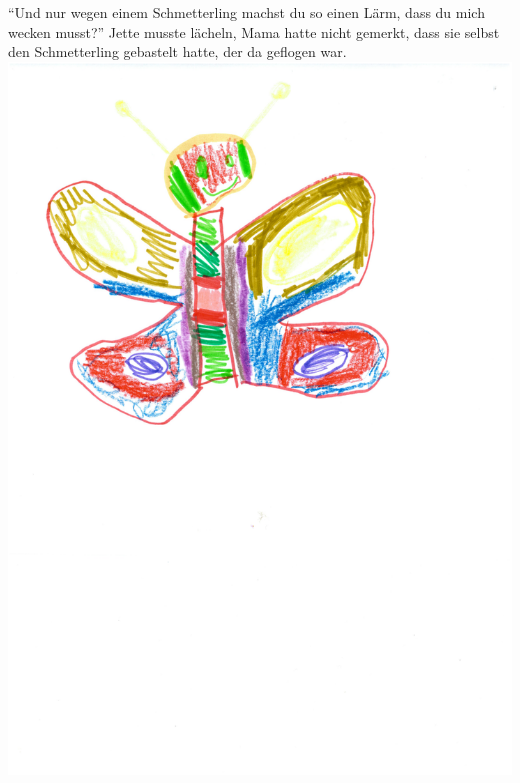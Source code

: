 \enquote{Und nur wegen einem Schmetterling machst du so einen Lärm, dass du mich wecken musst?} Jette musste lächeln, Mama hatte nicht gemerkt, dass sie selbst den Schmetterling gebastelt hatte, der da geflogen war. \hfill {\color{red}\decofourleft}
\newpage
\includegraphics[trim=2cm 22cm 2cm 2cm, scale=0.5]{pinarella.pdf}
